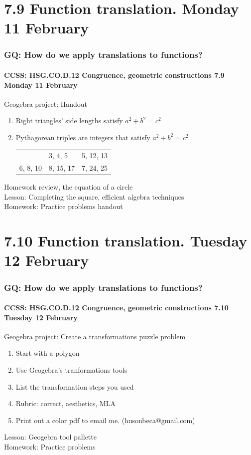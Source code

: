 \documentclass{beamer}
\begin{document}
\section{7.9 Function translation. Monday 11 February}
  \frame
  {
    \frametitle{GQ: How do we apply translations to functions?}
    \framesubtitle{CCSS: HSG.CO.D.12 Congruence, geometric constructions \hfill \alert{7.9 Monday 11 February}}

    \begin{block}{Geogebra project: Handout}
      \begin{enumerate}
        \item Right triangles' side lengths satisfy $a^2+b^2=c^2$
        \item Pythagorean triples are integers that satisfy $a^2+b^2=c^2$\\
        \begin{tabular}{lll}
          & 3, 4, 5 &  5, 12, 13 \\
          6, 8, 10 & 8, 15, 17 & 7, 24, 25
        \end{tabular}
      \end{enumerate}
    \end{block}
    Homework review, the equation of a circle\\
    Lesson: Completing the square, efficient algebra techniques\\[0.5cm]
    Homework: Practice problems handout
  }

\section{7.10 Function translation. Tuesday 12 February}
  \frame
  {
    \frametitle{GQ: How do we apply translations to functions?}
    \framesubtitle{CCSS: HSG.CO.D.12 Congruence, geometric constructions \hfill \alert{7.10 Tuesday 12 February}}

    \begin{block}{Geogebra project: Create a transformations puzzle problem}
      \begin{enumerate}
        \item Start with a polygon
        \item Use Geogebra's tranformations tools
        \item List the transformation steps you used
        \item Rubric: correct, aesthetics, MLA
        \item Print out a color pdf to email me. (husonbeca@gmail.com)
      \end{enumerate}
    \end{block}
    Lesson: Geogebra tool pallette\\[0.5cm]
    Homework: Practice problems
  }
\end{document}

